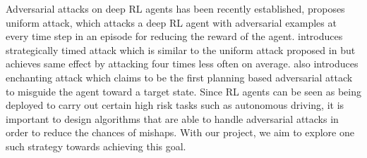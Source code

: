 Adversarial attacks on deep RL agents has been recently established, \cite{thirteen} proposes uniform attack, which attacks a deep RL agent with adversarial examples at every time step in an episode for reducing the reward of the agent. \cite{fourteen} introduces strategically timed attack which is similar to the uniform attack proposed in \cite{thirteen} but achieves same effect by attacking four times less often on average. \cite{fourteen} also introduces enchanting attack which claims to be the first planning based adversarial attack to misguide the agent toward a target state. Since RL agents can be seen as being deployed to carry out certain high risk tasks such as autonomous driving, it is important to design algorithms that are able to handle adversarial attacks in order to reduce the chances of mishaps. With our project, we aim to explore one such strategy towards achieving this goal. 

